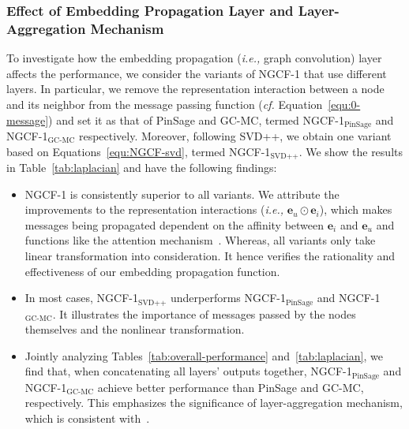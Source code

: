 \documentclass[sigconf]{acmart}
\newcommand{\Mat}[1]{\mathbf{#1}}
\newcommand{\ie}{\emph{i.e., }}
\newcommand{\cf}{\emph{cf. }}
\theoremstyle{definition}
\begin{document}
\subsubsection{\textbf{Effect of Embedding Propagation Layer and Layer-Aggregation Mechanism}}\label{sec:layer-effect}

To investigate how the embedding propagation (\ie graph convolution) layer affects the performance, we consider the variants of NGCF-1 that use different layers.
In particular, we remove the representation interaction between a node and its neighbor from the message passing function (\cf Equation~\eqref{equ:0-message}) and set it as that of PinSage and GC-MC, termed NGCF-1$_{\text{PinSage}}$ and NGCF-1$_{\text{GC-MC}}$ respectively.
Moreover, following SVD++, we obtain one variant based on Equations~\eqref{equ:NGCF-svd}, termed NGCF-1$_{\text{SVD++}}$.
We show the results in Table~\ref{tab:laplacian} and have the following findings:

\begin{itemize}[leftmargin=*]
    \item NGCF-1 is consistently superior to all variants. We attribute the improvements to the representation interactions (\ie $\Mat{e}_{u}\odot\Mat{e}_{i}$), which makes messages being propagated dependent on the affinity between $\Mat{e}_i$ and $\Mat{e}_u$ and functions like the attention mechanism~\cite{ACF}. Whereas, all variants only take linear transformation into consideration. It hence verifies the rationality and effectiveness of our embedding propagation function.
    
    \item In most cases, NGCF-1$_{\text{SVD++}}$ underperforms NGCF-1$_{\text{PinSage}}$ and NGCF-1$_{\text{GC-MC}}$. It illustrates the importance of messages passed by the nodes themselves and the nonlinear transformation.
    
    \item Jointly analyzing Tables~\ref{tab:overall-performance} and~\ref{tab:laplacian}, we find that, when concatenating all layers' outputs together, NGCF-1$_{\text{PinSage}}$ and NGCF-1$_{\text{GC-MC}}$ achieve better performance than PinSage and GC-MC, respectively.
    This emphasizes the significance of layer-aggregation mechanism, which is consistent with~\cite{JumpKG}.
\end{itemize}
\end{document}
